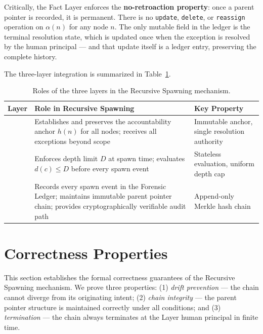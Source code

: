 Critically, the Fact Layer enforces the \textbf{no-retroaction property}: once a parent pointer is recorded, it is permanent. There is no \texttt{update}, \texttt{delete}, or \texttt{reassign} operation on $\alpha(n)$ for any node $n$. The only mutable field in the ledger is the terminal resolution state, which is updated once when the exception is resolved by the human principal — and that update itself is a ledger entry, preserving the complete history.

The three-layer integration is summarized in Table~\ref{tab:layer-roles}.

\begin{table}[htbp]
\caption{Roles of the three \bxthree{} layers in the Recursive Spawning mechanism.}
\label{tab:layer-roles}
\begin{tabular}{@{}lp{6.5cm}p{5cm}@{}}
\toprule
Layer & Role in Recursive Spawning & Key Property \\
\midrule
\purpose{} & Establishes and preserves the accountability anchor $h(n)$ for all nodes; receives all exceptions beyond \bounds{} scope & Immutable anchor, single resolution authority \\
\bounds{} & Enforces depth limit $D$ at spawn time; evaluates $d(c) \leq D$ before every spawn event & Stateless evaluation, uniform depth cap \\
\fact{} & Records every spawn event in the Forensic Ledger; maintains immutable parent pointer chain; provides cryptographically verifiable audit path & Append-only Merkle hash chain \\
\bottomrule
\end{tabular}
\end{table}

\section{Correctness Properties}
\label{sec:correctness}

This section establishes the formal correctness guarantees of the Recursive Spawning mechanism. We prove three properties: (1) \emph{drift prevention} — the chain cannot diverge from its originating intent; (2) \emph{chain integrity} — the parent pointer structure is maintained correctly under all conditions; and (3) \emph{termination} — the chain always terminates at the \purpose{} Layer human principal in finite time.

